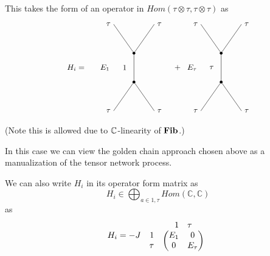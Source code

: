This takes the form of an operator in $Hom(\tau \otimes \tau, \tau \otimes
\tau)$ as
\[
  \begin{tikzpicture}[scale=1.2,
    every node/.style={font=\small},
    fusion/.style={circle,fill=black,inner sep=1.2pt}
]

\node at (-2, 0.5) {$H_i = $};

\node at (-1, 0.5) {$E_1$};

\begin{scope}
  \node[fusion] (v1) at (0,0) {};
\node[fusion] (v2) at (0,1) {};

\draw (v1) -- (-0.7,-1);
\draw (v1) -- (0.7,-1);

\draw (v2) -- (0.7,2);
\draw (v2) -- (-0.7,2);

\draw (v1) -- (v2);

\node[left]  at (-0.7,-1) {$\tau$};
\node[right] at (0.7,-1) {$\tau$};
\node[left]  at (-0.7,2) {$\tau$};
\node[right] at (0.7,2) {$\tau$};

\node[left] at (-0.15,0.5) {$1$};

\end{scope}

\node at (1.5,0.5) {$+$};

\node at (2, 0.5) {$E_\tau$};

\begin{scope}[xshift=3cm]
  \node[fusion] (v1) at (0,0) {};
  \node[fusion] (v2) at (0,1) {};

  \draw (v1) -- (-0.7,-1);
  \draw (v1) -- (0.7,-1);

  \draw (v2) -- (0.7,2);
  \draw (v2) -- (-0.7,2);

  \draw (v1) -- (v2);

  \node[left]  at (-0.7,-1) {$\tau$};
  \node[right] at (0.7,-1) {$\tau$};
  \node[left]  at (-0.7,2) {$\tau$};
  \node[right] at (0.7,2) {$\tau$};

  \node[left] at (-0.15,0.5) {$\tau$};

\end{scope}

\end{tikzpicture}
\]
(Note this is allowed due to $\mathbb{C}$-linearity of $\mathbf{Fib}$.)


In this case we can view the golden chain approach chosen above as a manualization of the
tensor network process.

We can also write $H_i$ in its operator form matrix as
\[
  H_{i} \in \bigoplus_{a \in 1,\tau} Hom(\mathbb{C}, \mathbb{C})
\]
as 
\[
  H_i = -J \begin{array}{r@{\hspace{0.5em}}c}
  & \begin{array}{cc} 1 & \tau \end{array} \\
  \begin{array}{r} 1 \\ \tau \end{array} & 
  \begin{pmatrix}
   E_1 & 0\\
   0 & E_\tau   \\
  \end{pmatrix}
\end{array}
\]

